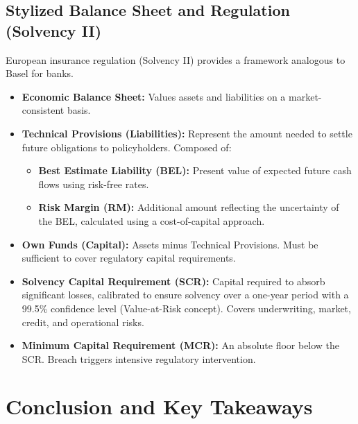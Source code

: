 \subsection{Stylized Balance Sheet and Regulation (Solvency II)}
European insurance regulation (Solvency II) provides a framework analogous to Basel for banks.
\begin{itemize}
    \item \textbf{Economic Balance Sheet:} Values assets and liabilities on a market-consistent basis.
    \item \textbf{Technical Provisions (Liabilities):} Represent the amount needed to settle future obligations to policyholders. Composed of:
        \begin{itemize}
            \item \textbf{Best Estimate Liability (BEL):} Present value of expected future cash flows using risk-free rates.
            \item \textbf{Risk Margin (RM):} Additional amount reflecting the uncertainty of the BEL, calculated using a cost-of-capital approach.
        \end{itemize}
    \item \textbf{Own Funds (Capital):} Assets minus Technical Provisions. Must be sufficient to cover regulatory capital requirements.
    \item \textbf{Solvency Capital Requirement (SCR):} Capital required to absorb significant losses, calibrated to ensure solvency over a one-year period with a 99.5\% confidence level (Value-at-Risk concept). Covers underwriting, market, credit, and operational risks.
    \item \textbf{Minimum Capital Requirement (MCR):} An absolute floor below the SCR. Breach triggers intensive regulatory intervention.
\end{itemize}

\section{Conclusion and Key Takeaways}

